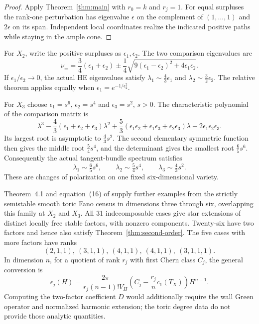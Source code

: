 \begin{proof}
Apply Theorem~\ref{thm:main} with $r_0=k$ and $r_j=1$.
For equal surpluses the rank-one perturbation has eigenvalue
$\epsilon$ on the complement of $(1,\ldots,1)$ and $2\epsilon$
on its span. Independent local coordinates realize the indicated
positive paths while staying in the ample cone.
\end{proof}

\begin{example}
For $X_2$, write the positive surpluses as $\epsilon_1,\epsilon_2$.
The two comparison eigenvalues are
\[
 \nu_\pm=\frac34(\epsilon_1+\epsilon_2)
    \pm\frac14\sqrt{9(\epsilon_1-\epsilon_2)^2+4\epsilon_1\epsilon_2}.
\]
If $\epsilon_1/\epsilon_2\to0$, the actual HE eigenvalues satisfy
$\lambda_1\sim\frac43\epsilon_1$ and
$\lambda_2\sim\frac32\epsilon_2$. The relative theorem applies
equally when $\epsilon_1=e^{-1/\epsilon_2^2}$.
\end{example}

\begin{example}
For $X_3$ choose $\epsilon_1=s^6$, $\epsilon_2=s^4$ and
$\epsilon_3=s^2$, $s>0$. The characteristic polynomial of the
comparison matrix is
\[
 \lambda^3-\frac43(\epsilon_1+\epsilon_2+\epsilon_3)\lambda^2
 +\frac53(\epsilon_1\epsilon_2+\epsilon_1\epsilon_3+
                         \epsilon_2\epsilon_3)\lambda
 -2\epsilon_1\epsilon_2\epsilon_3.
\]
Its largest root is asymptotic to $\frac43s^2$. The second elementary
symmetric function then gives the middle root $\frac54s^4$, and
the determinant gives the smallest root $\frac65s^6$.
Consequently the actual tangent-bundle spectrum satisfies
\[
 \lambda_1\sim\tfrac65s^6,\qquad
 \lambda_2\sim\tfrac54s^4,\qquad
 \lambda_3\sim\tfrac43s^2.
\]
These are changes of polarization on one fixed six-dimensional variety.
\end{example}

Theorem~4.1 and equation~(16) of \cite{Chambers} supply further examples
from the strictly semistable smooth toric Fano census in dimensions
three through six, overlapping this family at $X_2$ and $X_3$.
All 31 indecomposable cases give star extensions of distinct locally
free stable factors, with nonzero components. Twenty-six have two
factors and hence also
satisfy Theorem~\ref{thm:second-order}. The five cases with more
factors have ranks
\[
 (2,1,1),\ (3,1,1),\ (4,1,1),\ (4,1,1),\ (3,1,1,1).
\]
In dimension $n$, for a quotient of rank $r_j$ with first Chern class
$C_j$, the general conversion is
\[
 \epsilon_j(H)=\frac{2\pi}{r_j(n-1)!V_H}
       \left(C_j-\frac{r_j}{n}c_1(T_X)\right)H^{n-1}.
\]
Computing the two-factor
coefficient $D$ would additionally require the wall Green operator
and normalized harmonic extension; the toric degree data do not
provide those analytic quantities.

